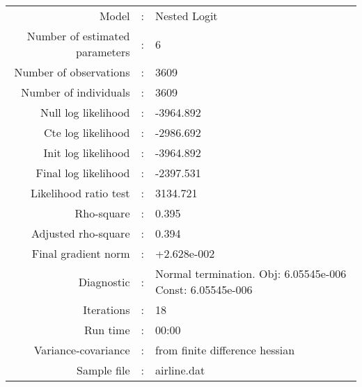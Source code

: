 

\begin{flushleft}
\begin{tabular}{rcl}
\hline
Model &:& Nested Logit\\
Number of estimated parameters&:&6\\
Number of  observations &:& 3609\\
Number of individuals&:&3609\\
Null log likelihood&:&-3964.892\\
Cte log likelihood&:&-2986.692\\
Init log likelihood&:&-3964.892\\
Final log likelihood&:&-2397.531\\
Likelihood ratio test &:&3134.721\\
Rho-square&:&0.395\\
Adjusted rho-square&:&0.394\\
Final gradient norm&:&+2.628e-002\\
Diagnostic&:&Normal termination. Obj: 6.05545e-006 Const: 6.05545e-006\\
Iterations&:&18\\
Run time&:&00:00\\
Variance-covariance&:&from finite difference hessian\\
Sample file&:&airline.dat\\
\end{tabular}
\end{flushleft}
